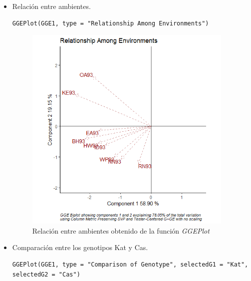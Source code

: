 \begin{itemize}
\item Relación entre ambientes.

\begin{lstlisting}
GGEPlot(GGE1, type = "Relationship Among Environments")
\end{lstlisting}

\begin{figure}[H]
	\begin{center}
		\includegraphics[width=10cm]{./Graficos/RelationshipAmongEnvironments.png}
	\end{center}
	\caption{Relación entre ambientes obtenido de la función \emph{GGEPlot}}
\end{figure}

\item Comparación entre los genotipos Kat y Cas.

\begin{lstlisting}
GGEPlot(GGE1, type = "Comparison of Genotype", selectedG1 = "Kat", selectedG2 = "Cas")
\end{lstlisting}


\end{itemize}
